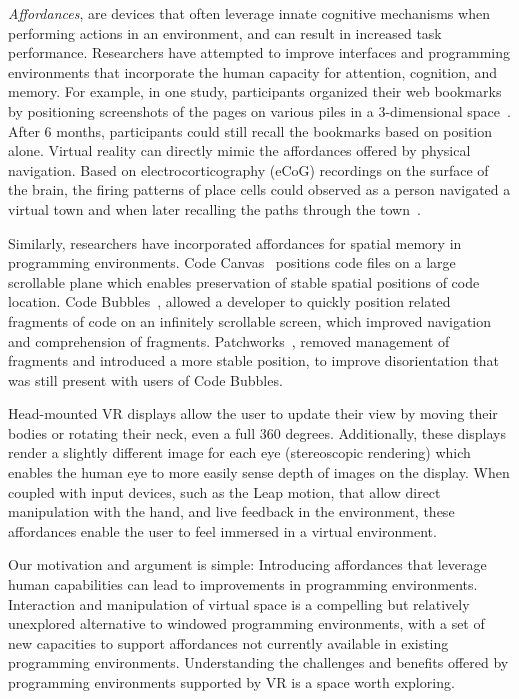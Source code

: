 \documentclass[conference]{IEEEtran}
\begin{document}
\emph{Affordances}, are devices that often leverage innate cognitive mechanisms when performing actions in an environment, and can result in increased task performance. 
Researchers have attempted to improve interfaces and programming environments that incorporate the human capacity for attention, cognition, and memory.
For example, in one study, participants organized their web bookmarks by positioning screenshots of the pages on various piles in a 3-dimensional space~\cite{Data Mountain}. 
After 6 months, participants could still recall the bookmarks based on position alone.  Virtual reality can directly mimic the affordances offered by physical navigation. Based on electrocorticography (eCoG) recordings on the surface of the brain, the firing patterns of place cells could observed as a person navigated a virtual town and when later recalling the paths through the town~\cite{EkstEta}.

Similarly, researchers have incorporated affordances for spatial memory in programming environments.  Code Canvas~\cite{DeLine:CodeCanvas} positions code files on a large scrollable plane which enables preservation of stable spatial positions of code location.  Code Bubbles~\cite{Bragdon:CodeBubbles}, allowed a developer to quickly position related fragments of code on an infinitely scrollable screen, which improved navigation and comprehension of fragments.  Patchworks~\cite{}, removed management of fragments and introduced a more stable position, to improve disorientation that was still present with users of Code Bubbles.

Head-mounted VR displays allow the user to update their view by moving their bodies or rotating their neck, even a full 360 degrees.
Additionally, these displays render a slightly different image for each eye (stereoscopic rendering) which enables the human eye to more easily sense depth of images on the display.
When coupled with input devices, such as the Leap motion, that allow direct manipulation with the hand, and live feedback in the environment, these affordances enable the user to feel immersed in a virtual environment.


Our motivation and argument is simple: 
Introducing affordances that leverage human capabilities can lead to improvements in programming environments.
Interaction and manipulation of virtual space is a compelling but relatively unexplored alternative to windowed programming environments, with a set of new capacities to support affordances not currently available in existing programming environments.   Understanding the challenges and benefits offered by programming environments supported by VR is a space worth exploring.
\end{document}
